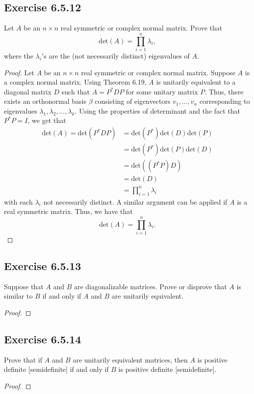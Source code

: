 \subsection*{Exercise 6.5.12} Let \( A  \) be an \( n \times n  \) real symmetric or complex normal matrix. Prove that 
\[  \text{det}(A) = \prod_{i=1}^{n} {\lambda}_{i}, \]
where the \( {\lambda}_{i}' \)s are the (not necessarily distinct) eigenvalues of \( A  \).
\begin{proof}

    Let \( A  \) be an \( n \times n  \) real symmetric or complex normal matrix. Suppose \( A  \) is a complex normal matrix. Using Theorem 6.19, \( A  \) is unitarily equivalent to a diagonal matrix \( D  \) such that  \( A =P^{*} D P  \) for some unitary matrix \( P  \). Thus, there exists an orthonormal basis \( \beta  \) consisting of eigenvectors \( {v}_{1}, \dots, {v}_{n} \) corresponding to eigenvalues \( {\lambda}_{1}, {\lambda}_{2}, \dots, {\lambda}_{k}   \). Using the properties of determinant and the fact that \( P^{*}P = I  \), we get that
    \begin{align*}
       \text{det}(A) = \text{det}(P^{*}D P)  &= \text{det}(P^{*}) \text{det}(D) \text{det}(P) \\
                                             &= \text{det}(P^{*})\text{det}(P) \text{det}(D) \\ 
                                             &= \text{det}((P^{*}P)D) \\
                                             &= \text{det}(D) \\
                                             &=  \prod_{i=1}^{n} {\lambda}_{i}
    \end{align*}
    with each \( {\lambda}_{i} \) not necessarily distinct. A similar argument can be applied if \( A  \) is a real symmetric matrix. Thus, we have that
    \[  \text{det}(A) = \prod_{i=1}^{n} {\lambda}_{i}. \]
\end{proof}

\subsection*{Exercise 6.5.13} Suppose that \( A  \) and \( B  \) are diagonalizable matrices. Prove or disprove that \( A  \) is similar to \( B  \) if and only if \( A  \) and \( B  \) are unitarily equivalent. 
\begin{proof}

\end{proof}

\subsection*{Exercise 6.5.14} Prove that if \( A  \) and \( B  \) are unitarily equivalent matrices, then \( A  \) is positive definite [semidefinite] if and only if \( B  \) is positive definite [semidefinite].
\begin{proof}

\end{proof}
